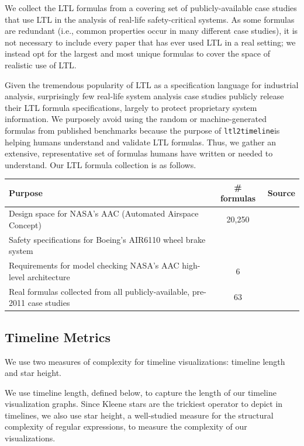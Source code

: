 \documentclass[preprint,12pt]{elsarticle}
\theoremstyle{definition}
\theoremstyle{remark}
\newcommand{\tool}{\hspace{0.1cm}\texttt{ltl2timeline}\hspace{0.1cm}}
\begin{document}
We collect the LTL formulas from a covering set of publicly-available case studies that use LTL in the analysis of real-life safety-critical systems. As some formulas are redundant (i.e., common properties occur in many different case studies), it is not necessary to include every paper that has ever used LTL in a real setting; we instead opt for the largest and most unique formulas to cover the space of realistic use of LTL.

Given the tremendous popularity of LTL as a specification language for industrial analysis, surprisingly few real-life system analysis case studies publicly release their LTL formula specifications, largely to protect proprietary system information. We purposely avoid using the random or machine-generated formulas from published benchmarks because the purpose of \tool is helping humans understand and validate LTL formulas. Thus, we gather an extensive, representative set of formulas humans have written or needed to understand. Our LTL formula collection is as follows.

\noindent
\begin{table}[h]
\begin{tabular}{p{3.6in}|c|c}
  \hline
  Purpose & \# formulas & Source \\
  \hline
  Design space for NASA's AAC (Automated Airspace Concept) & 20,250 & \cite{GCMTR16} \\
  \hline
  Safety specifications for Boeing's AIR6110 wheel brake system & & \cite{BCFJKPRT15} \\
  \hline
  Requirements for model checking NASA's AAC high-level architecture & 6 & \cite{ZR14} \\
  \hline
  Real formulas collected from all publicly-available, pre-2011 case studies & 63 & \cite{RV11} \\
  \hline
\end{tabular}
\end{table}


\subsection{Timeline Metrics}
\label{sec:metrics}


We use two measures of complexity for timeline visualizations: timeline length and star height.

We use timeline length, defined below, to capture the length of our timeline visualization graphs. Since Kleene stars are the trickiest operator to depict in timelines, we also use star height, a well-studied measure for the structural complexity of regular expressions, to measure the complexity of our visualizations.
\end{document}
